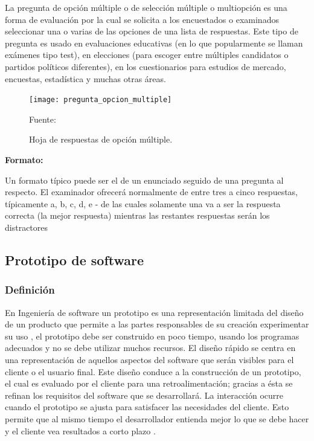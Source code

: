 La pregunta de opción múltiple o de selección múltiple o multiopción es una forma de
evaluación por la cual se solicita a los encuestados o examinados seleccionar una o varias de las opciones de una lista de respuestas.
\vskip 1cm 
Este tipo de pregunta es usado en evaluaciones educativas (en lo que popularmente se llaman exámenes tipo test), en elecciones (para escoger entre múltiples candidatos o partidos políticos diferentes), en los cuestionarios para estudios de mercado, encuestas, estadística y muchas otras áreas.

\begin{figure}[ht]
	\begin{center}
		\texttt{[image: pregunta\_opcion\_multiple]}
	\end{center}
	\begin{center}
		\vskip -0.5cm
		\caption{\small{Hoja de respuestas de opción múltiple.}}
		{\small{Fuente: \citep{pregunta_opcion_multiple}}}
	\end{center}
\end{figure}
 
{\bf Formato:}\par

Un formato típico puede ser el de un enunciado seguido de una pregunta al respecto. El examinador ofrecerá normalmente de entre tres a cinco respuestas, típicamente a, b, c, d, e - de las cuales solamente una va a ser la respuesta correcta (la mejor respuesta) mientras las restantes respuestas serán los distractores \citep{salkind}
\vskip 1cm 


\subsection{Prototipo de software}

\subsubsection{Definición}

En Ingeniería de software un prototipo es una representación limitada del diseño de un producto que permite a las partes responsables de su creación experimentar su uso \citep{pressman_troya}, el prototipo debe ser construido en poco tiempo, usando los programas adecuados y no se debe utilizar muchos recursos.
\vskip 0.3cm
El diseño rápido se centra en una representación de aquellos aspectos del software que serán visibles para el cliente o el usuario final. Este diseño conduce a la construcción de un prototipo, el cual es evaluado por el cliente para una retroalimentación; gracias a ésta se refinan los requisitos del software que se desarrollará. La interacción ocurre cuando el prototipo se ajusta para satisfacer las necesidades del cliente. Esto permite que al mismo tiempo el desarrollador entienda mejor lo que se debe hacer y el cliente vea resultados a corto plazo \citep{pressman_troya}.


